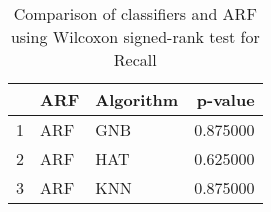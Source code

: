 \begin{table}
\footnotesize
\caption{Comparison of classifiers and ARF using Wilcoxon signed-rank test for Recall}
\label{tab:ARF wilcoxon Recall comparison}
\begin{tabular}{lllr}
\hline
 & ARF & Algorithm & p-value \\
\hline
1 & ARF & GNB & 0.875000 \\
2 & ARF & HAT & 0.625000 \\
3 & ARF & KNN & 0.875000 \\
\hline
\end{tabular}
\end{table}

